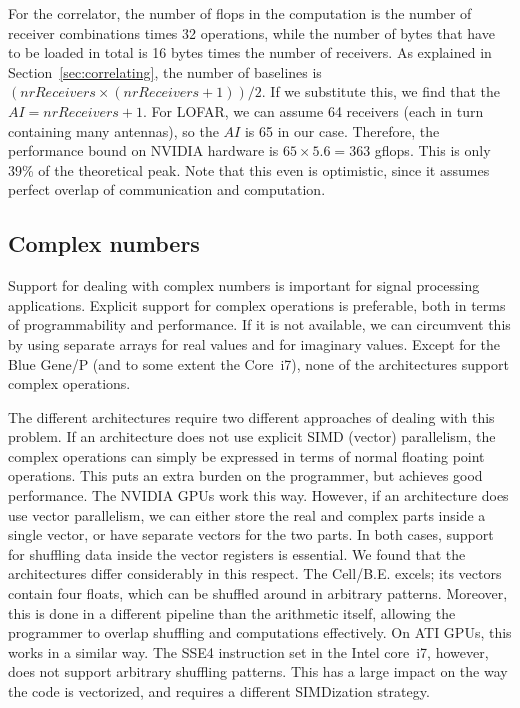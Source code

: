 \documentclass{article}
\begin{document}
For the correlator, the number of flops in the computation is the
number of receiver combinations times 32 operations, while the number
of bytes that have to be loaded in total is 16 bytes times the number
of receivers.  As explained in Section~\ref{sec:correlating}, the
number of baselines is $(nrReceivers \times (nrReceivers + 1)) / 2$.
If we substitute this, we find that the $AI = nrReceivers + 1$.  For
LOFAR, we can assume 64 receivers (each in turn containing many
antennas), so the $AI$ is 65 in our case.  Therefore, the performance
bound on NVIDIA hardware is $65 \times 5.6 = 363$ gflops. This is only
39\% of the theoretical peak.  Note that this even is optimistic,
since it assumes perfect overlap of communication and computation.


\subsection{Complex numbers}

Support for dealing with complex numbers is important for signal
processing applications. Explicit support for complex operations is
preferable, both in terms of programmability and performance.  If it
is not available, we can circumvent this by using separate arrays for
real values and for imaginary values.  Except for the Blue Gene/P (and
to some extent the Core~i7), none of the architectures support
complex operations.

The different architectures require two different approaches of
dealing with this problem. If an architecture does not use
explicit SIMD (vector) parallelism, the complex operations can simply
be expressed in terms of normal floating point operations. This puts
an extra burden on the programmer, but achieves good performance. The
NVIDIA GPUs work this way.  However, if an architecture does use vector
parallelism, we can either store the real and complex parts inside a
single vector, or have separate vectors for the two parts.  In both
cases, support for shuffling data inside the vector registers is
essential. We found that the architectures differ considerably in this
respect.  The Cell/B.E. excels; its vectors contain four floats, which
can be shuffled around in arbitrary patterns. Moreover, this is done
in a different pipeline than the arithmetic itself, allowing the
programmer to overlap shuffling and computations effectively.  On ATI
GPUs, this works in a similar way.  The SSE4 instruction set in the
Intel core~i7, however, does not support arbitrary shuffling patterns.
This has a large impact on the way the code is vectorized, and
requires a different SIMDization strategy. 
\end{document}
